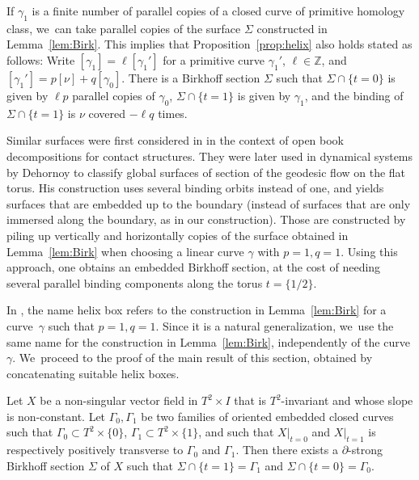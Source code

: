 \begin{Remark}\label{rem:Multcurv}
If $\gamma_1$ is a finite number of parallel copies of a closed curve of primitive homology class, we~can take parallel copies of the surface $\Sigma$ constructed in Lemma~\ref{lem:Birk}. This implies that Proposition~\ref{prop:helix} also holds stated as follows: Write $[\gamma_1]=\ell [\gamma_1']$ for a primitive curve $\gamma_1'$, $\ell \in \mathbb{Z}$, and $[\gamma_1']=p[\nu] + q [\gamma_0]$. There is a Birkhoff section $\Sigma$ such that $\Sigma\cap \{t=0\}$ is given by $\ell p$ parallel copies of $\gamma_0$, $\Sigma\cap \{t=1\}$ is given by $\gamma_1$, and the binding of $\Sigma\cap \{t=1\}$ is $\nu$ covered $-\ell q$ times.
\end{Remark}

\begin{Remark}\label{rem:embDeh}
Similar surfaces were first considered in \cite{VHM} in the context of open book decompositions for contact structures. They were later used in dynamical systems by Dehornoy \cite{Deh, Deh2} to classify global surfaces of section of the geodesic flow on the flat torus. His construction uses several binding orbits instead of one, and yields surfaces that are embedded up to the boundary (instead of surfaces that are only immersed along the boundary, as in our construction). Those are constructed by piling up vertically and horizontally copies of the surface obtained in Lemma~\ref{lem:Birk} when choosing a linear curve $\gamma$ with $p=1,q=1$. Using this approach, one obtains an embedded Birkhoff section, at the cost of needing several parallel binding components along the torus $t=\{1/2\}$.

In \cite{Deh, Deh2}, the name helix box refers to the construction in Lemma~\ref{lem:Birk} for a curve~$\gamma$ such that $p=1,q=1$. Since it is a natural generalization, we~use the same name for the construction in Lemma~\ref{lem:Birk}, independently of the curve $\gamma$. We~proceed to the proof of the main result of this section, obtained by concatenating suitable helix boxes.
\end{Remark}

\begin{prop}\label{prop:BirkT2}
Let $X$ be a non-singular vector field in $T^2\times I$ that is $T^2$-invariant and whose slope is non-constant. Let $\Gamma_0,\Gamma_1$ be two families of oriented embedded closed curves such that $\Gamma_0 \subset T^2\times \{0\}$, $\Gamma_1\subset T^2\times \{1\}$, and such that $X|_{t=0}$ and $X|_{t=1}$ is respectively positively transverse to $\Gamma_0$ and $\Gamma_1$. Then there exists a $\partial$-strong Birkhoff section $\Sigma$ of $X$ such that $\Sigma \cap \{t=1\}=\Gamma_1$ and $\Sigma \cap \{t=0\}=\Gamma_0$.
\end{prop}


